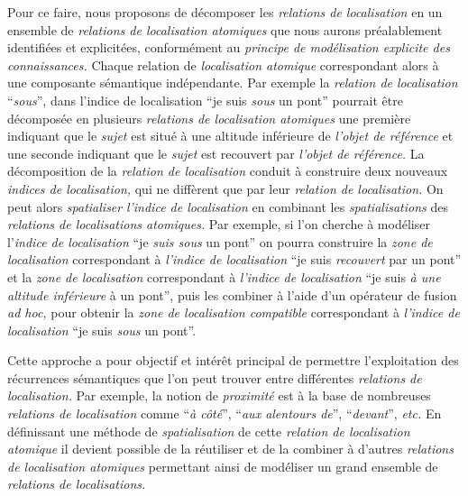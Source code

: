 Pour ce faire, nous proposons de décomposer les \emph{relations de
  localisation} en un ensemble de \emph{relations de localisation
  atomiques} que nous aurons préalablement identifiées et explicitées,
conformément au \emph{principe de modélisation explicite des
  connaissances.} Chaque relation de \emph{localisation atomique}
correspondant alors à une composante sémantique indépendante. Par
exemple la \emph{relation de localisation} \enquote{\emph{sous}}, dans
l'indice de localisation \enquote{je suis \emph{sous} un pont}
pourrait être décomposée en plusieurs \emph{relations de localisation
  atomiques} une première indiquant que le \emph{sujet} est situé à
une altitude inférieure de \emph{l'objet de référence} et une seconde
indiquant que le \emph{sujet} est recouvert par \emph{l'objet de
  référence.} La décomposition de la \emph{relation de localisation}
conduit à construire deux nouveaux \emph{indices de localisation,} qui
ne diffèrent que par leur \emph{relation de localisation.} On peut
alors \emph{spatialiser} \emph{l'indice de localisation} en combinant
les \emph{spatialisations} des \emph{relations de localisations
  atomiques.} Par exemple, si l'on cherche à modéliser l'\emph{indice
  de localisation} \enquote{je \emph{suis sous} un pont} on pourra
construire la \emph{zone de localisation} correspondant à
\emph{l'indice de localisation} \enquote{je suis \emph{recouvert} par
  un pont} et la \emph{zone de localisation} correspondant à
\emph{l'indice de localisation} \enquote{je suis \emph{à une altitude
    inférieure} à un pont}, puis les combiner à l'aide d'un opérateur
de fusion \emph{ad hoc,} pour obtenir la \emph{zone de localisation
  compatible} correspondant à \emph{l'indice de localisation}
\enquote{je suis \emph{sous} un pont}.


Cette approche a pour objectif et intérêt principal de permettre
l'exploitation des récurrences sémantiques que l'on peut trouver entre
différentes \emph{relations de localisation.} Par exemple, la notion
de \emph{proximité} est à la base de nombreuses \emph{relations de
  localisation} comme \enquote{\emph{à côté}}, \enquote{\emph{aux
    alentours de}}, \enquote{\emph{devant}}, \emph{etc.} En
définissant une méthode de \emph{spatialisation} de cette
\emph{relation de localisation atomique} il devient possible de la
réutiliser et de la combiner à d'autres \emph{relations de
  localisation atomiques} permettant ainsi de modéliser un grand
ensemble de \emph{relations de localisations.}

